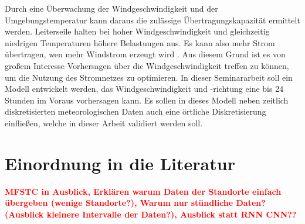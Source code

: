 \documentclass[
12pt, %
toc=listofnumbered, %
toc=chapterentrydotfill, %
numbers=noenddot, %
captions=tableheading, %
bibliography=numbered
]{scrreprt}
\let\Oldsection\section
\renewcommand{\section}{\FloatBarrier\Oldsection}
\newcommand{\highlight}[1]{\textbf{\textcolor{red}{#1}}}
\begin{document}
Durch eine Überwachung der Windgeschwindigkeit und der Umgebungstemperatur kann daraus die zulässige Übertragungskapazität ermittelt werden. 
Leiterseile halten bei hoher Windgeschwindigkeit und gleichzeitig niedrigen Temperaturen höhere Belastungen aus. 
Es kann also mehr Strom übertragen, wen mehr Windstrom erzeugt wird \cite{2015_Axthelm_BisFaktenZur}. Aus diesem Grund ist es von großem Interesse Vorhersagen über die Windgeschwindigkeit treffen zu können, um 
die Nutzung des Stromnetzes zu optimieren. In dieser Seminararbeit soll ein Modell entwickelt werden, das 
Windgeschwindigkeit und -richtung eine bis 24 Stunden im Voraus vorhersagen kann. Es sollen in dieses Modell neben zeitlich diskretisierten 
meteorologischen Daten auch eine örtliche Diskretisierung einfließen, welche in dieser Arbeit validiert werden soll.

\section{Einordnung in die Literatur}

\highlight{MFSTC in Ausblick, Erklären warum Daten der Standorte einfach übergeben (wenige Standorte?), Warum nur stündliche Daten? (Ausblick kleinere Intervalle der Daten?), Ausblick statt RNN CNN??\bigskip}
\end{document}
